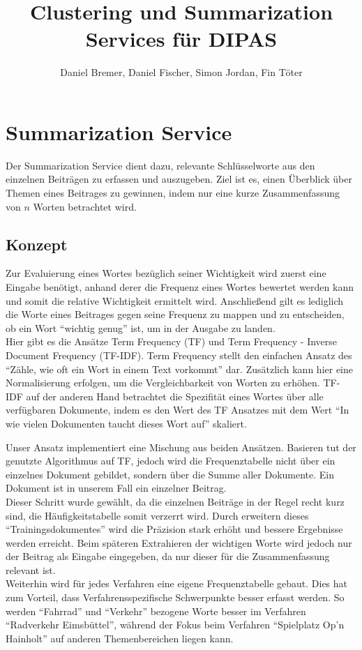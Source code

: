 \documentclass[10pt,a4paper]{article}
\author{Daniel Bremer, Daniel Fischer, Simon Jordan, Fin Töter}
\title{Clustering und Summarization Services für DIPAS}
\begin{document}
\maketitle

\section{Summarization Service}
Der Summarization Service dient dazu, relevante Schlüsselworte aus den einzelnen Beiträgen zu erfassen und auszugeben. Ziel ist es, einen Überblick über Themen eines Beitrages zu gewinnen, indem nur eine kurze Zusammenfassung von $n$ Worten betrachtet wird.

\subsection{Konzept}
\label{konzept}
Zur Evaluierung eines Wortes bezüglich seiner Wichtigkeit wird zuerst eine Eingabe benötigt, anhand derer die Frequenz eines Wortes bewertet werden kann und somit die relative Wichtigkeit ermittelt wird. Anschließend gilt es lediglich die Worte eines Beitrages gegen seine Frequenz zu mappen und zu entscheiden, ob ein Wort \enquote{wichtig genug} ist, um in der Ausgabe zu landen.\\
Hier gibt es die Ansätze Term Frequency (TF) und Term Frequency - Inverse Document Frequency (TF-IDF). Term Frequency stellt den einfachen Ansatz des \enquote{Zähle, wie oft ein Wort in einem Text vorkommt} dar. Zusätzlich kann hier eine Normalisierung erfolgen, um die Vergleichbarkeit von Worten zu erhöhen. TF-IDF auf der anderen Hand betrachtet die Spezifität eines Wortes über alle verfügbaren Dokumente, indem es den Wert des TF Ansatzes mit dem Wert \enquote{In wie vielen Dokumenten taucht dieses Wort auf} skaliert.

Unser Ansatz implementiert eine Mischung aus beiden Ansätzen. Basieren tut der genutzte Algorithmus auf TF, jedoch wird die Frequenztabelle nicht über ein einzelnes Dokument gebildet, sondern über die Summe aller Dokumente. Ein Dokument ist in unserem Fall ein einzelner Beitrag.\\
Dieser Schritt wurde gewählt, da die einzelnen Beiträge in der Regel recht kurz sind, die Häufigkeitstabelle somit verzerrt wird. Durch erweitern dieses \enquote{Trainingsdokumentes} wird die Präzision stark erhöht und bessere Ergebnisse werden erreicht. Beim späteren Extrahieren der wichtigen Worte wird jedoch nur der Beitrag als Eingabe eingegeben, da nur dieser für die Zusammenfassung relevant ist.\\
Weiterhin wird für jedes Verfahren eine eigene Frequenztabelle gebaut. Dies hat zum Vorteil, dass Verfahrensspezifische Schwerpunkte besser erfasst werden. So werden \enquote{Fahrrad} und \enquote{Verkehr} bezogene Worte besser im Verfahren \enquote{Radverkehr Eimsbüttel}, während der Fokus beim Verfahren \enquote{Spielplatz Op'n Hainholt} auf anderen Themenbereichen liegen kann.
\end{document}
